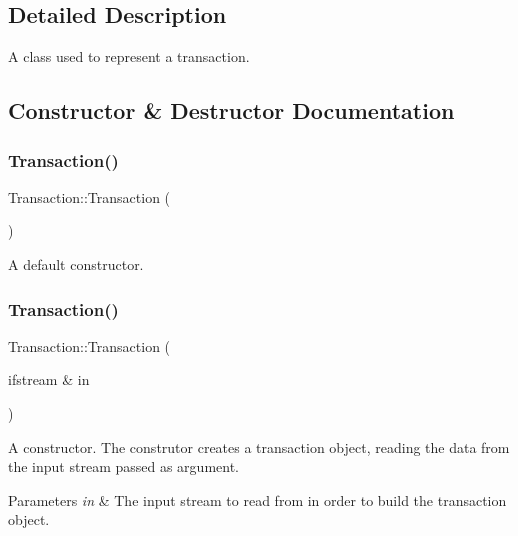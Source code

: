 \subsection{Detailed Description}
A class used to represent a transaction. 

\subsection{Constructor \& Destructor Documentation}
\hypertarget{class_transaction_a0c8031bed6e7a45eda7bc2ca8f40e851}{}\label{class_transaction_a0c8031bed6e7a45eda7bc2ca8f40e851} 
\subsubsection{\texorpdfstring{Transaction()}{Transaction()}\hspace{0.1cm}{\footnotesize\ttfamily [1/3]}}
{\footnotesize\ttfamily Transaction\+::\+Transaction (\begin{DoxyParamCaption}{ }\end{DoxyParamCaption})\hspace{0.3cm}{\ttfamily [default]}}

A default constructor. \hypertarget{class_transaction_a2bbb78694a94a630cb1e9e741dc120a7}{}\label{class_transaction_a2bbb78694a94a630cb1e9e741dc120a7} 
\subsubsection{\texorpdfstring{Transaction()}{Transaction()}\hspace{0.1cm}{\footnotesize\ttfamily [2/3]}}
{\footnotesize\ttfamily Transaction\+::\+Transaction (\begin{DoxyParamCaption}\item[{ifstream \&}]{in }\end{DoxyParamCaption})}

A constructor. The construtor creates a transaction object, reading the data from the input stream passed as argument. 
\begin{DoxyParams}{Parameters}
{\em in} & The input stream to read from in order to build the transaction object. \\
\hline
\end{DoxyParams}
\hypertarget{class_transaction_abd1826b5a0499ddac290a4f1297e7455}{}\label{class_transaction_abd1826b5a0499ddac290a4f1297e7455} 
